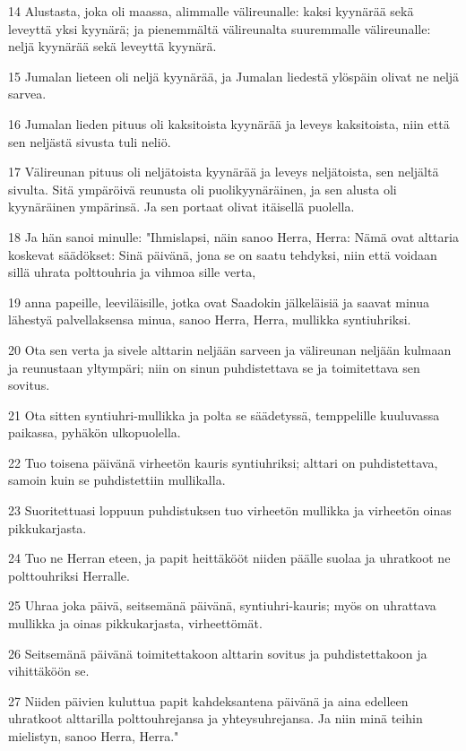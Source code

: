 \par 14 Alustasta, joka oli maassa, alimmalle välireunalle: kaksi kyynärää sekä leveyttä yksi kyynärä; ja pienemmältä välireunalta suuremmalle välireunalle: neljä kyynärää sekä leveyttä kyynärä.
\par 15 Jumalan lieteen oli neljä kyynärää, ja Jumalan liedestä ylöspäin olivat ne neljä sarvea.
\par 16 Jumalan lieden pituus oli kaksitoista kyynärää ja leveys kaksitoista, niin että sen neljästä sivusta tuli neliö.
\par 17 Välireunan pituus oli neljätoista kyynärää ja leveys neljätoista, sen neljältä sivulta. Sitä ympäröivä reunusta oli puolikyynäräinen, ja sen alusta oli kyynäräinen ympärinsä. Ja sen portaat olivat itäisellä puolella.
\par 18 Ja hän sanoi minulle: "Ihmislapsi, näin sanoo Herra, Herra: Nämä ovat alttaria koskevat säädökset: Sinä päivänä, jona se on saatu tehdyksi, niin että voidaan sillä uhrata polttouhria ja vihmoa sille verta,
\par 19 anna papeille, leeviläisille, jotka ovat Saadokin jälkeläisiä ja saavat minua lähestyä palvellaksensa minua, sanoo Herra, Herra, mullikka syntiuhriksi.
\par 20 Ota sen verta ja sivele alttarin neljään sarveen ja välireunan neljään kulmaan ja reunustaan yltympäri; niin on sinun puhdistettava se ja toimitettava sen sovitus.
\par 21 Ota sitten syntiuhri-mullikka ja polta se säädetyssä, temppelille kuuluvassa paikassa, pyhäkön ulkopuolella.
\par 22 Tuo toisena päivänä virheetön kauris syntiuhriksi; alttari on puhdistettava, samoin kuin se puhdistettiin mullikalla.
\par 23 Suoritettuasi loppuun puhdistuksen tuo virheetön mullikka ja virheetön oinas pikkukarjasta.
\par 24 Tuo ne Herran eteen, ja papit heittäkööt niiden päälle suolaa ja uhratkoot ne polttouhriksi Herralle.
\par 25 Uhraa joka päivä, seitsemänä päivänä, syntiuhri-kauris; myös on uhrattava mullikka ja oinas pikkukarjasta, virheettömät.
\par 26 Seitsemänä päivänä toimitettakoon alttarin sovitus ja puhdistettakoon ja vihittäköön se.
\par 27 Niiden päivien kuluttua papit kahdeksantena päivänä ja aina edelleen uhratkoot alttarilla polttouhrejansa ja yhteysuhrejansa. Ja niin minä teihin mielistyn, sanoo Herra, Herra."

